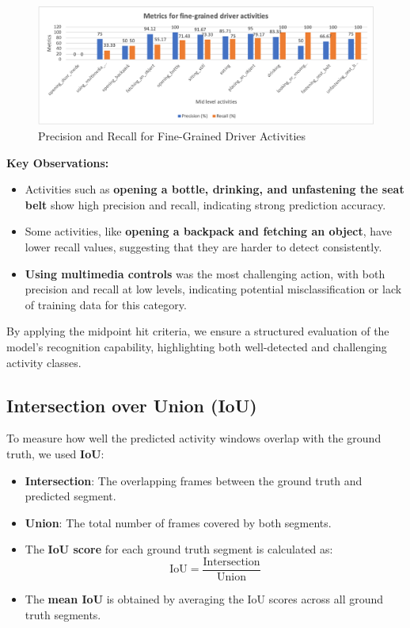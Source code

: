 \documentclass{article}
\begin{document}
\begin{figure}[ht]
    \centering
    \includegraphics[width=\linewidth]{figs/metrics2.png}
    \caption{Precision and Recall for Fine-Grained Driver Activities}
    \label{fig:driver-activities}
\end{figure}

\textbf{Key Observations:}
\begin{itemize}
    \item Activities such as \textbf{opening a bottle, drinking, and unfastening the seat belt} show high precision and recall, indicating strong prediction accuracy.
    \item Some activities, like \textbf{opening a backpack and fetching an object}, have lower recall values, suggesting that they are harder to detect consistently.
    \item \textbf{Using multimedia controls} was the most challenging action, with both precision and recall at low levels, indicating potential misclassification or lack of training data for this category.
\end{itemize}

By applying the midpoint hit criteria, we ensure a structured evaluation of the model's recognition capability, highlighting both well-detected and challenging activity classes.

\subsection{Intersection over Union (IoU)}

To measure how well the predicted activity windows overlap with the ground truth, we used \textbf{IoU}:

\begin{itemize}
    \item \textbf{Intersection}: The overlapping frames between the ground truth and predicted segment.
    \item \textbf{Union}: The total number of frames covered by both segments.
    \item The \textbf{IoU score} for each ground truth segment is calculated as:
    \begin{equation}
        \text{IoU} = \frac{\text{Intersection}}{\text{Union}}
    \end{equation}
    \item The \textbf{mean IoU} is obtained by averaging the IoU scores across all ground truth segments.
\end{itemize}
\end{document}
